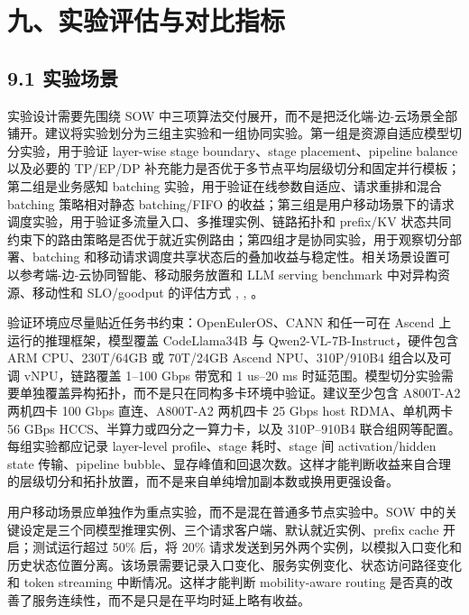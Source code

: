 \clearpage
{}
\section*{九、实验评估与对比指标}

\subsection*{9.1 实验场景}

实验设计需要先围绕 SOW 中三项算法交付展开，而不是把泛化端-边-云场景全部铺开。建议将实验划分为三组主实验和一组协同实验。第一组是资源自适应模型切分实验，用于验证 layer-wise stage boundary、stage placement、pipeline balance 以及必要的 TP/EP/DP 补充能力是否优于多节点平均层级切分和固定并行模板；第二组是业务感知 batching 实验，用于验证在线参数自适应、请求重排和混合 batching 策略相对静态 batching/FIFO 的收益；第三组是用户移动场景下的请求调度实验，用于验证多流量入口、多推理实例、链路拓扑和 prefix/KV 状态共同约束下的路由策略是否优于就近实例路由；第四组才是协同实验，用于观察切分部署、batching 和移动请求调度共享状态后的叠加收益与稳定性。相关场景设置可以参考端-边-云协同智能、移动服务放置和 LLM serving benchmark 中对异构资源、移动性和 SLO/goodput 的评估方式 \cite{zhong2024distserve}, \cite{duan2022distributed}, \cite{ouyang2018follow}。

验证环境应尽量贴近任务书约束：OpenEulerOS、CANN 和任一可在 Ascend 上运行的推理框架，模型覆盖 CodeLlama34B 与 Qwen2-VL-7B-Instruct，硬件包含 ARM CPU、230T/64GB 或 70T/24GB Ascend NPU、310P/910B4 组合以及可调 vNPU，链路覆盖 1--100 Gbps 带宽和 1 us--20 ms 时延范围。模型切分实验需要单独覆盖异构拓扑，而不是只在同构多卡环境中验证。建议至少包含 A800T-A2 两机四卡 100 Gbps 直连、A800T-A2 两机四卡 25 Gbps host RDMA、单机两卡 56 GBps HCCS、半算力或四分之一算力卡，以及 310P--910B4 联合组网等配置。每组实验都应记录 layer-level profile、stage 耗时、stage 间 activation/hidden state 传输、pipeline bubble、显存峰值和回退次数。这样才能判断收益来自合理的层级切分和拓扑放置，而不是来自单纯增加副本数或换用更强设备。

用户移动场景应单独作为重点实验，而不是混在普通多节点实验中。SOW 中的关键设定是三个同模型推理实例、三个请求客户端、默认就近实例、prefix cache 开启；测试运行超过 50\% 后，将 20\% 请求发送到另外两个实例，以模拟入口变化和历史状态位置分离。该场景需要记录入口变化、服务实例变化、状态访问路径变化和 token streaming 中断情况。这样才能判断 mobility-aware routing 是否真的改善了服务连续性，而不是只是在平均时延上略有收益。

